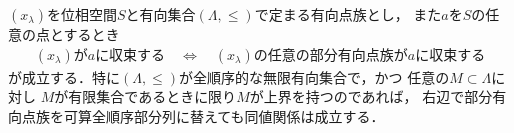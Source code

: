 	\begin{screen}
		\begin{thm}
		\label{thm:a_net_converges_iff_every_subnet_converges}
			$(x_\lambda)$を位相空間$S$と有向集合$(\Lambda,\leq)$で定まる有向点族とし，
			また$a$を$S$の任意の点とするとき
			\begin{align}
				\mbox{$(x_\lambda)$が$a$に収束する}
				\quad \Longleftrightarrow \quad
				\mbox{$(x_\lambda)$の任意の部分有向点族が$a$に収束する}
				\label{eq:thm_a_net_converges_iff_every_subnet_converges_2}
			\end{align}
			が成立する．特に$(\Lambda,\leq)$が全順序的な無限有向集合で，かつ
			任意の$M \subset \Lambda$に対し
			$M$が有限集合であるときに限り$M$が上界を持つのであれば，
			右辺で部分有向点族を可算全順序部分列に替えても同値関係は成立する．
		\end{thm}
	\end{screen}
	
